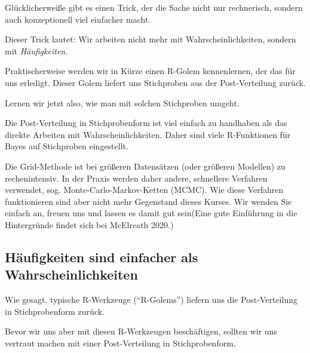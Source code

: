 \documentclass[
  a4paper,
  DIV=11]{scrreprt}
\theoremstyle{definition}
\theoremstyle{remark}
\begin{document}
Glücklicherweiße gibt es einen Trick, der die Sache nicht nur
rechnerisch, sondern auch konzeptionell viel einfacher macht.

Dieser Trick lautet: Wir arbeiten nicht mehr mit Wahrscheinlichkeiten,
sondern mit \emph{Häufigkeiten.}

Praktischerweise werden wir in Kürze einen R-Golem kennenlernen, der das
für uns erledigt. Dieser Golem liefert uns Stichproben aus der
Post-Verteilung zurück.

Lernen wir jetzt also, wie man mit solchen Stichproben umgeht.

\begin{tcolorbox}[enhanced jigsaw, leftrule=.75mm, toptitle=1mm, bottomtitle=1mm, titlerule=0mm, breakable, colframe=quarto-callout-important-color-frame, title=\textcolor{quarto-callout-important-color}{\faExclamation}\hspace{0.5em}{Wichtig}, rightrule=.15mm, colback=white, arc=.35mm, left=2mm, bottomrule=.15mm, coltitle=black, opacitybacktitle=0.6, toprule=.15mm, colbacktitle=quarto-callout-important-color!10!white, opacityback=0]
Die Post-Verteilung in Stichprobenform ist viel einfach zu handhaben als
das direkte Arbeiten mit Wahrscheinlichkeiten. Daher sind viele
R-Funktionen für Bayes auf Stichproben eingestellt.
\end{tcolorbox}

Die Grid-Methode ist bei größeren Datensätzen (oder größeren Modellen)
zu rechenintensiv. In der Praxis werden daher andere, schnellere
Verfahren verwendet, sog. Monte-Carlo-Markov-Ketten (MCMC). Wie diese
Verfahren funktionieren sind aber nicht mehr Gegenstand dieses Kurses.
Wir wenden Sie einfach an, freuen uns und lassen es damit gut sein(Eine
gute Einführung in die Hintergründe findet sich bei McElreath 2020.)

\hypertarget{huxe4ufigkeiten-sind-einfacher-als-wahrscheinlichkeiten}{%
\subsection{Häufigkeiten sind einfacher als
Wahrscheinlichkeiten}\label{huxe4ufigkeiten-sind-einfacher-als-wahrscheinlichkeiten}}

Wie gesagt, typische R-Werkzeuge (``R-Golems'') liefern uns die
Post-Verteilung in Stichprobenform zurück.

Bevor wir uns aber mit diesen R-Werkzeugen beschäftigen, sollten wir uns
vertraut machen mit einer Post-Verteilung in Stichprobenform.
\end{document}
